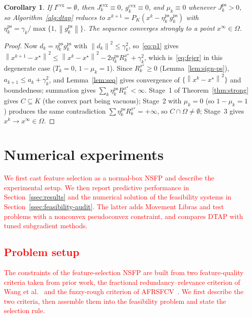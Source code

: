 \documentclass[]{interact}
\theoremstyle{plain}
\newtheorem{corollary}[theorem]{Corollary}
\theoremstyle{definition}
\theoremstyle{remark}
\newcommand{\norm}[1]{\left\lVert #1 \right\rVert}
\newcommand{\cvx}{\mathrm{cvx}}
\newcommand{\ps}{\mathrm{ps}}
\begin{document}
\begin{corollary}\label{cor:ps}
If $I^{\cvx}=\emptyset$, then $J^{\cvx}_k\equiv0$, $g^{\cvx}_k\equiv0$, and $\mu_k\equiv0$ whenever $J^{\ps}_k>0$, so Algorithm~\ref{alg:dtap} reduces to $x^{k+1}=P_K(x^k-\eta^{\ps}_k g^{\ps}_k)$ with $\eta^{\ps}_k=\gamma_k/\max\{1,\norm{g^{\ps}_k}\}$. The sequence converges strongly to a point $x^\infty\in\Omega$.
\end{corollary}
\begin{proof}
Now $d_k=\eta^{\ps}_k g^{\ps}_k$ with $\norm{d_k}^2\le\gamma_k^2$, so~\eqref{eq:p1} gives $\norm{x^{k+1}-x^\star}^2\le\norm{x^k-x^\star}^2-2\eta^{\ps}_k R^{x^\star}_k+\gamma_k^2$, which is~\eqref{eq:fejer} in this degenerate case ($T_k=0$, $1-\mu_k=1$). Since $R^{x^\star}_k\ge0$ (Lemma~\ref{lem:sign-ps}), $a_{k+1}\le a_k+\gamma_k^2$, and Lemma~\ref{lem:seq} gives convergence of $\{\norm{x^k-x^\star}^2\}$ and boundedness; summation gives $\sum_k\eta^{\ps}_k R^{x^\star}_k<\infty$. Stage~1 of Theorem~\ref{thm:strong} gives $C\subseteq K$ (the convex part being vacuous); Stage~2 with $\mu_k=0$ (so $1-\mu_k=1$) produces the same contradiction $\sum\eta^{\ps}_k R^{x^\star}_k=+\infty$, so $C\cap\Omega\ne\emptyset$; Stage~3 gives $x^k\to x^\infty\in\Omega$.
\end{proof}


\section{Numerical experiments}\label{sec:experiments}
\leavevmode\textcolor{red}{We first cast feature selection as a normal-box NSFP and describe the experimental setup. We then report predictive performance in Section~\ref{ssec:results} and the numerical solution of the feasibility systems in Section~\ref{ssec:feasibility-audit}. The latter adds Movement Libras and test problems with a nonconvex pseudoconvex constraint, and compares DTAP with tuned subgradient methods.}

\subsection{\textcolor{red}{Problem setup}}\label{sec:fs}
\leavevmode\textcolor{red}{The constraints of the feature-selection NSFP are built from two feature-quality criteria taken from prior work, the fractional redundancy--relevance criterion of Wang et al.~\citep{wang2021fractional} and the fuzzy-rough criterion of AFRSFCV~\citep{wang2026afrsfcv}. We first describe the two criteria, then assemble them into the feasibility problem and state the selection rule.}
\end{document}
